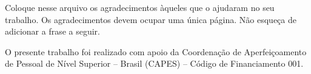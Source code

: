Coloque nesse arquivo os agradecimentos àqueles que o ajudaram no seu trabalho.
Os agradecimentos devem ocupar uma única página. Não esqueça de adicionar a
frase a seguir.

O presente trabalho foi realizado com apoio da Coordenação de Aperfeiçoamento de
Pessoal de Nível Superior -- Brasil (CAPES) -- Código de Financiamento 001.